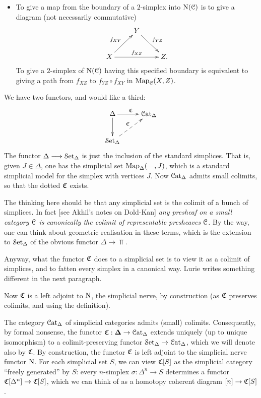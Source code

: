 \begin{1.1.5 inf-cats vs simplicial cats}
\begin{itemize}
\item To give a map from the boundary of a $2$-simplex into
$\operatorname{N}(\operatorname{\mathcal{C}})$ is to give a diagram (not necessarily commutative)
$$ \xymatrix{ & Y \ar[dr]^{f_{YZ}} & \\
X \ar[ur]^{f_{XY}} \ar[rr]^{f_{XZ}} & & Z. }$$
To give a $2$-simplex of $\operatorname{N}(\operatorname{\mathcal{C}})$ having this specified boundary is equivalent to
giving a path from $f_{XZ}$ to $f_{YZ} \circ f_{XY}$ in
$\operatorname{{Map}}_{\operatorname{\mathcal{C}}}(X,Z)$.
\end{itemize}
\begin{shaded}
We have two functors, and would like a third:
\[\xymatrix{
\Delta\ar[r]^\sCoNerve\ar[d]&\sCat\\
\sSet\ar@{-->}[ur]^\sCoNerve
}\]
The functor $\Delta\longrightarrow\operatorname{\mathcal{S}et_{\Delta}}$ is just the inclusion of the standard simplices. That is, given $J\in\Delta$, one has the simplicial set $\operatorname{{Map}}_{\Delta}(\textup{---},J)$, which is a standard simplicial model for the simplex with vertices $J$. Now $\operatorname{\mathcal{C}at_{\Delta}}$ admits small colimits, so that the dotted $\operatorname{\mathfrak{C}}$ exists. 

The thinking here should be that any simplicial set is the colimit of a bunch of simplices. In fact [see Akhil's notes on Dold-Kan]  \textit{any presheaf on a small category $\operatorname{\mathcal{C}}$ is canonically the colimit of representable presheaves $\operatorname{\mathcal{C}}$.}
By the way, one can think about geometric realisation in these terms, which is the extension to $\operatorname{\mathcal{S}et_{\Delta}}$ of the obvious functor $\Delta\to\Top$.

Anyway, what the functor $\operatorname{\mathfrak{C}}$ does to a simplicial set is to view it as a colimit of simplices, and to fatten every simplex in a canonical way. Lurie writes something different in the next paragraph.

Now $\operatorname{\mathfrak{C}}$ is a left adjoint to $\operatorname{N}$, the simplicial nerve, by construction (as $\operatorname{\mathfrak{C}}$ preserves colimits, and using the definition).
\end{shaded}

The category $\operatorname{\mathcal{C}at_{\Delta}}$ of simplicial categories admits (small)
colimits. Consequently, by formal nonsense, the functor
$\operatorname{\mathfrak{C}}: \operatorname{{\bf \Delta}} \rightarrow \operatorname{\mathcal{C}at_{\Delta}}$ extends uniquely (up to unique isomorphism) to a
colimit-preserving functor $\operatorname{\mathcal{S}et_{\Delta}} \rightarrow \operatorname{\mathcal{C}at_{\Delta}}$, which we
will denote also by $\operatorname{\mathfrak{C}}$. By construction, the functor
$\operatorname{\mathfrak{C}}$ is left adjoint to the simplicial nerve functor $\operatorname{N}$. For each simplicial set $S$, we can view $\operatorname{\mathfrak{C}}[S]$ as the simplicial category ``freely generated'' by $S$: every $n$-simplex $\sigma: \Delta^n \rightarrow S$ determines a functor $\operatorname{\mathfrak{C}}[\Delta^n] \rightarrow \operatorname{\mathfrak{C}}[S]$, which we can think of as a homotopy coherent diagram $[n] \rightarrow \operatorname{\mathfrak{C}}[S]$. 


\end{1.1.5 inf-cats vs simplicial cats}
